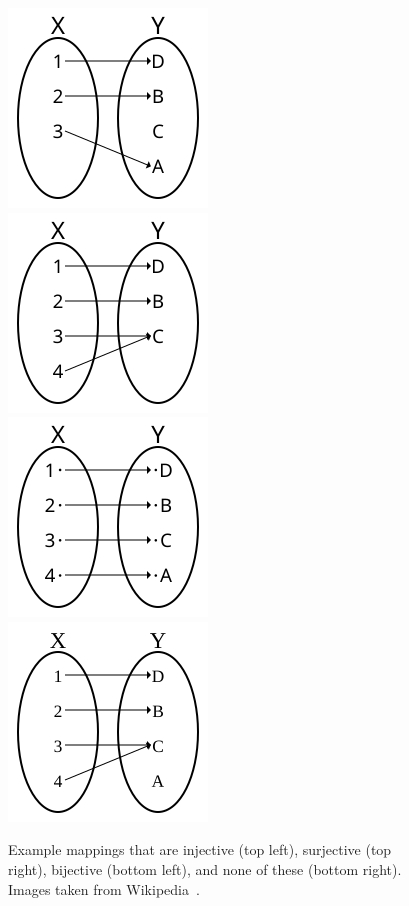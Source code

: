 \begin{figure}
\centering
\includegraphics[width=0.45\linewidth]{figs/Injection.png}~~~
\includegraphics[width=0.45\linewidth]{figs/Surjection.png}\\
\includegraphics[width=0.45\linewidth]{figs/Bijection.png}~~~
\includegraphics[width=0.45\linewidth]{figs/Not-Injection-Surjection.png}
\caption{Example mappings that are injective (top left), surjective (top right),
bijective (bottom left), and none of these (bottom right). Images taken from
Wikipedia~\cite{wiki:bijection}.}
\label{fig:mapping}
\end{figure}


